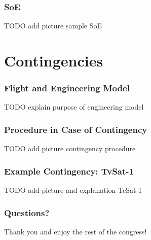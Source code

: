 \documentclass[12pt,utf8,notheorems,compress]{beamer}
\begin{document}
\begin{frame}
  \frametitle{SoE}
  \pause
  TODO add picture sample SoE
\end{frame}

\section{Contingencies}

\begin{frame}
  \frametitle{Flight and Engineering Model}
  \pause
  TODO explain purpose of engineering model
\end{frame}

\begin{frame}
  \frametitle{Procedure in Case of Contingency}
  \pause
  TODO add picture contingency procedure
\end{frame}

\begin{frame}
  \frametitle{Example Contingency: TvSat-1}
  \pause
  TODO add picture and explanation TcSat-1
\end{frame}





%     


\begin{frame}
  \frametitle{Questions?}
  \vfill
  \begin{center}
    \Large Thank you and enjoy the rest of the congress!
  \end{center}
  \vfill
\end{frame}
\end{document}
